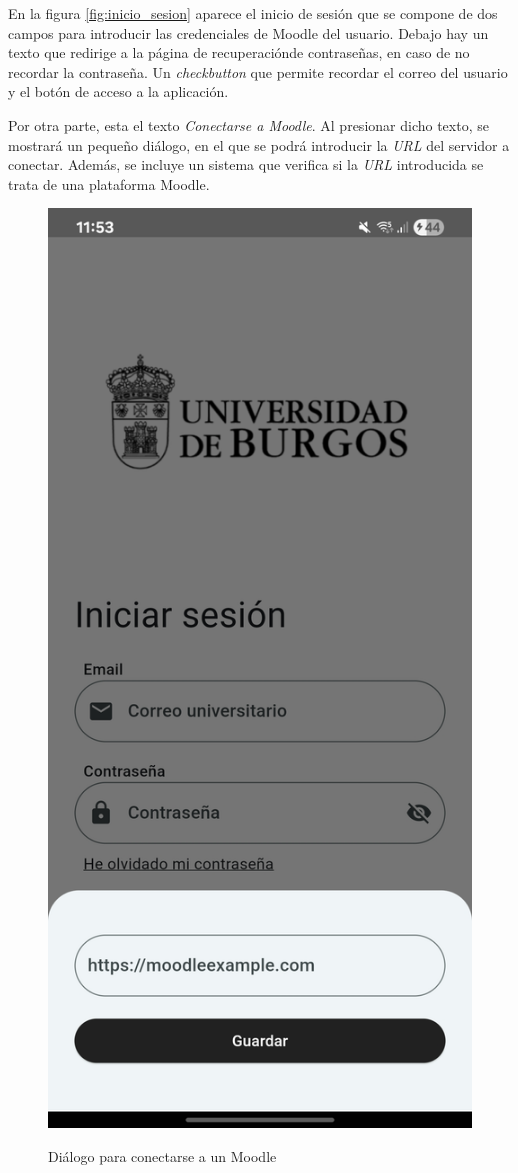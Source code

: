 En la figura \ref{fig:inicio_sesion} aparece el inicio de sesión que se compone de dos campos para introducir las credenciales de Moodle del usuario. Debajo hay un texto que redirige a la página de recuperaciónde contraseñas, en caso de no recordar la contraseña. Un \textit{checkbutton} que permite recordar el correo del usuario y el botón de acceso a la aplicación.

Por otra parte, esta el texto \textit{Conectarse a Moodle}. Al presionar dicho texto, se mostrará un pequeño diálogo, en el que se podrá introducir la \textit{URL} del servidor a conectar. Además, se incluye un sistema que verifica si la \textit{URL} introducida se trata de una plataforma Moodle.
\begin{figure}[H]
  \centering
  \begin{floatrow}
    \ffigbox
      {\includegraphics[width=0.5\linewidth]{img/conexion_moodle.jpg}}
      {\caption{Diálogo para conectarse a un Moodle}\label{fig:conexion_moodle}}
    \hfill
    \ffigbox

\end{floatrow}
\end{figure}
